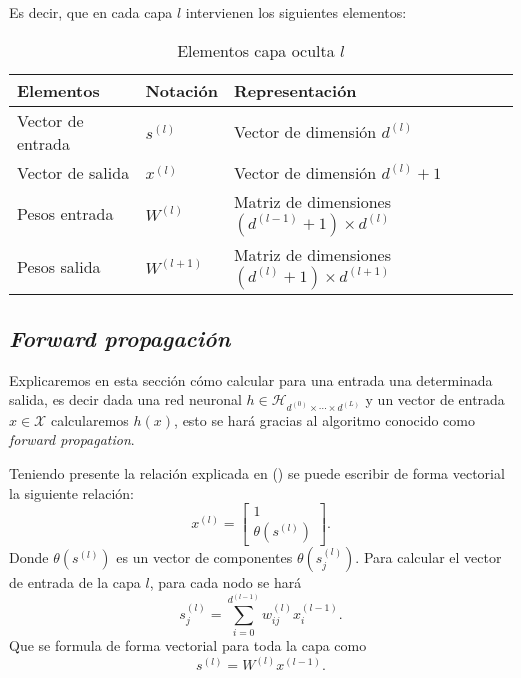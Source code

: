 Es decir, que en cada capa $l$ intervienen los siguientes elementos:  
\begin{table}[h]
    \begin{center}
    \begin{tabular}{| l | l | l |}
    \hline
    Elementos & Notación & Representación 
    \\ \hline
    Vector de entrada & $s^{(l)}$ &  Vector de dimensión $d^{(l)}$ \\
    Vector de salida & $x^{(l)}$ &  Vector de dimensión $d^{(l)}+ 1$ \\
    Pesos entrada & $W^{(l)}$ & Matriz de dimensiones $(d^{(l-1)}+1) \times d^{(l)}$ \\
    Pesos salida & $W^{(l+1)}$ 
    & Matriz de dimensiones $(d^{(l)}+1) \times d^{(l+1)}$ \\
    \hline
    \end{tabular}
    \caption{Elementos capa oculta $l$}
    \label{tab:rrnn_elementos_capa_oculta}
    \end{center}
\end{table}

\subsection{ \textit{Forward propagación}}\label{algoritmo-forward-propagation}

Explicaremos en esta sección cómo calcular para una entrada una determinada salida, es decir
dada una red neuronal $h \in \mathcal{H}_{d^{(0)} \times \cdots \times d^{(L)}}$ y un vector de entrada $x \in \mathcal{X}$ calcularemos  $h(x)$, esto se hará gracias al algoritmo conocido como \textit{forward propagation}.

Teniendo presente la relación  explicada en () se puede escribir de forma vectorial la siguiente relación: 
\begin{equation}
    x^{(l)} = 
    \left[ \begin{array}{c}
        1 \\
       \theta(s^{(l)})
        \end{array}
\right] .
\end{equation}
Donde $\theta(s^{(l)})$ es un vector de componentes $\theta(s^{(l)}_j)$. 
Para calcular el vector de entrada de la capa $l$, para cada nodo se hará
\begin{equation}
    s_j^{(l)} = \sum_{i=0}^{d^{(l-1)}} w_{i j}^{(l)}x_i^{(l-1)}.
\end{equation}
Que se formula de forma vectorial para toda la capa como 
\begin{equation}
    s^{(l)} = W^{(l)} x^{(l-1)}.
\end{equation}

